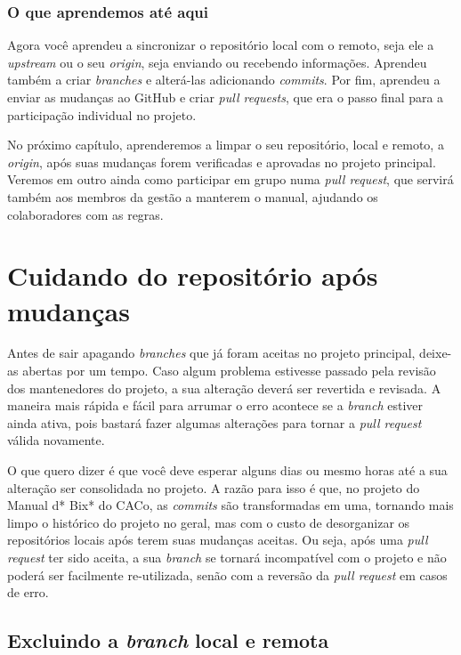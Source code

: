 \documentclass[a4paper,oneside,10pt]{memoir}
\begin{document}
\subsection{O que aprendemos até aqui}

Agora você aprendeu a sincronizar o repositório local com o remoto, seja ele
a \emph{upstream} ou o seu \emph{origin}, seja enviando ou recebendo
informações. Aprendeu também a criar \emph{branches} e alterá-las adicionando
\emph{commits}. Por fim, aprendeu a enviar as mudanças ao GitHub e criar
\emph{pull requests}, que era o passo final para a participação individual no
projeto.

No próximo capítulo, aprenderemos a limpar o seu repositório, local e remoto,
a \emph{origin}, após suas mudanças forem verificadas e aprovadas no projeto
principal. Veremos em outro ainda como participar em grupo numa \emph{pull
request}, que servirá também aos membros da gestão a manterem o manual,
ajudando os colaboradores com as regras.


\chapter{Cuidando do repositório após mudanças}

Antes de sair apagando \emph{branches} que já foram aceitas no projeto
principal, deixe-as abertas por um tempo. Caso algum problema estivesse passado
pela revisão dos mantenedores do projeto, a sua alteração deverá ser revertida
e revisada. A maneira mais rápida e fácil para arrumar o erro acontece se a
\emph{branch} estiver ainda ativa, pois bastará fazer algumas alterações para
tornar a \emph{pull request} válida novamente.

O que quero dizer é que você deve esperar alguns dias ou mesmo horas até a sua
alteração ser consolidada no projeto. A razão para isso é que, no projeto do
Manual d* Bix* do CACo, as \emph{commits} são transformadas em uma, tornando
mais limpo o histórico do projeto no geral, mas com o custo de desorganizar os
repositórios locais após terem suas mudanças aceitas. Ou seja, após uma
\emph{pull request} ter sido aceita, a sua \emph{branch} se tornará
incompatível com o projeto e não poderá ser facilmente re-utilizada, senão com
a reversão da \emph{pull request} em casos de erro.

\section{Excluindo a \emph{branch} local e remota}
\end{document}
